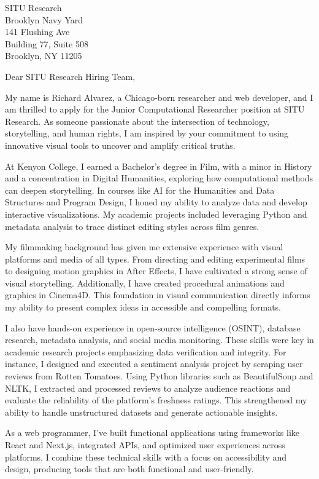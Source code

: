 \documentclass[a4paper,10pt]{letter}
\begin{document}
\begin{letter}{SITU Research \\
Brooklyn Navy Yard \\
141 Flushing Ave \\
Building 77, Suite 508 \\
Brooklyn, NY 11205 }

\opening{Dear SITU Research Hiring Team,}

My name is Richard Alvarez, a Chicago-born researcher and web developer, and I am thrilled to apply for the Junior Computational Researcher position at SITU Research. As someone passionate about the intersection of technology, storytelling, and human rights, I am inspired by your commitment to using innovative visual tools to uncover and amplify critical truths.  

At Kenyon College, I earned a Bachelor’s degree in Film, with a minor in History and a concentration in Digital Humanities, exploring how computational methods can deepen storytelling. In courses like AI for the Humanities and Data Structures and Program Design, I honed my ability to analyze data and develop interactive visualizations. My academic projects included leveraging Python and metadata analysis to trace distinct editing styles across film genres.  

My filmmaking background has given me extensive experience with visual platforms and media of all types. From directing and editing experimental films to designing motion graphics in After Effects, I have cultivated a strong sense of visual storytelling. Additionally, I have created procedural animations and graphics in Cinema4D. This foundation in visual communication directly informs my ability to present complex ideas in accessible and compelling formats.  

I also have hands-on experience in open-source intelligence (OSINT), database research, metadata analysis, and social media monitoring. These skills were key in academic research projects emphasizing data verification and integrity. For instance, I designed and executed a sentiment analysis project by scraping user reviews from Rotten Tomatoes. Using Python libraries such as BeautifulSoup and NLTK, I extracted and processed reviews to analyze audience reactions and evaluate the reliability of the platform’s freshness ratings. This strengthened my ability to handle unstructured datasets and generate actionable insights.  

As a web programmer, I’ve built functional applications using frameworks like React and Next.js, integrated APIs, and optimized user experiences across platforms. I combine these technical skills with a focus on accessibility and design, producing tools that are both functional and user-friendly.  


\end{letter}
\end{document}
